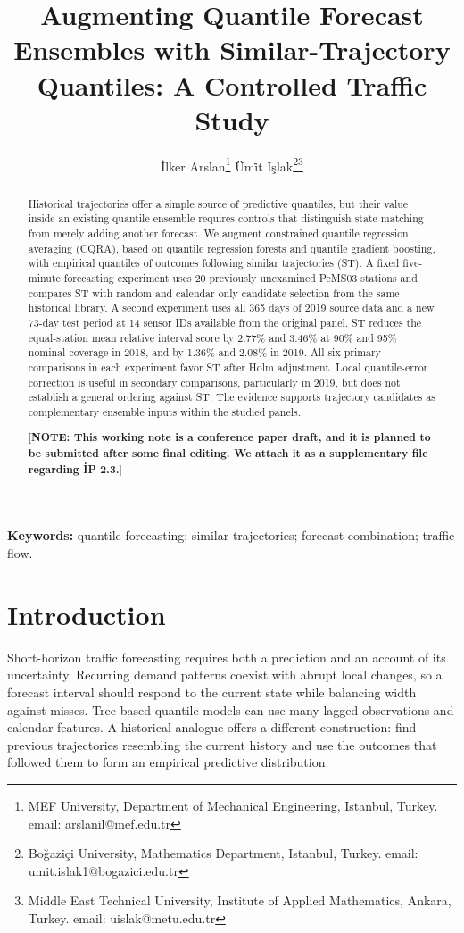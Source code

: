 \documentclass[11pt]{article}
\date{}
\author{}
\title{\bf Augmenting Quantile Forecast Ensembles with Similar-Trajectory Quantiles: A Controlled Traffic Study}
\author{\.{I}lker Arslan\footnote{MEF University, Department of Mechanical Engineering, Istanbul, Turkey. email: arslanil@mef.edu.tr}
	\hspace{0.2in} \"{U}m\.{i}t I\c{s}lak\footnote{Bo\u{g}azi\c{c}i University, Mathematics Department, Istanbul, Turkey. email: umit.islak1@bogazici.edu.tr}\footnote{Middle East Technical University, Institute of Applied Mathematics, Ankara, Turkey. email: uislak@metu.edu.tr}}
\date{}
\begin{document}
\maketitle
\begin{abstract}
Historical trajectories offer a simple source of predictive quantiles, but their value inside an existing quantile ensemble requires controls that distinguish state matching from merely adding another forecast. We augment constrained quantile regression averaging (CQRA), based on quantile regression forests and quantile gradient boosting, with empirical quantiles of outcomes following similar trajectories (ST). A fixed five-minute forecasting experiment uses 20 previously unexamined PeMS03 stations and compares ST with random and calendar only candidate selection from the same historical library. A second experiment uses all 365 days of 2019 source data and a new 73-day test period at 14 sensor IDs available from the original panel. ST reduces the equal-station mean relative interval score by 2.77\% and 3.46\% at 90\% and 95\% nominal coverage in 2018, and by 1.36\% and 2.08\% in 2019. All six primary comparisons in each experiment favor ST after Holm adjustment. Local quantile-error correction is useful in secondary comparisons, particularly in 2019, but does not establish a general ordering against ST. The evidence supports trajectory candidates as complementary ensemble inputs within the studied panels. %

 [\textbf{NOTE: This working note is a conference paper draft, and it is planned to  be submitted after some final editing. We attach it as a supplementary file regarding İP 2.3.}]
\end{abstract}
\noindent\textbf{Keywords:} quantile forecasting; similar trajectories; forecast combination; traffic flow. 

\section{Introduction}
Short-horizon traffic forecasting requires both a prediction and an account of its uncertainty. Recurring demand patterns coexist with abrupt local changes, so a forecast interval should respond to the current state while balancing width against misses. Tree-based quantile models can use many lagged observations and calendar features. A historical analogue offers a different construction: find previous trajectories resembling the current history and use the outcomes that followed them to form an empirical predictive distribution.
\end{document}
